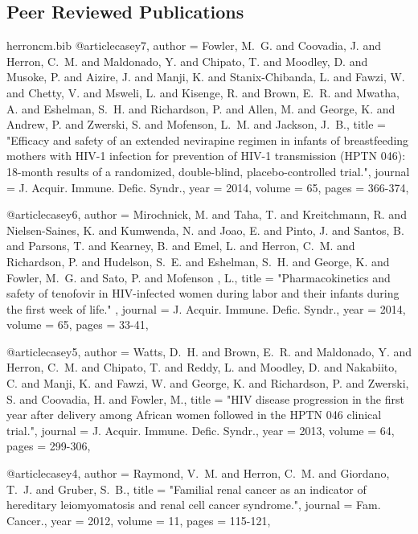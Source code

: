 \documentclass{res}
\begin{document}
\begin{resume}
\section{Peer Reviewed Publications}
\renewcommand{\section}[2]{}%
\begin{filecontents}{herroncm.bib}
@article{casey7,
author = {{Fowler}, M.~G. and {Coovadia}, J. and {Herron}, C.~M. and {Maldonado}, Y. and {Chipato}, T. and {Moodley}, D. and {Musoke}, P. and {Aizire}, J. and {Manji}, K. and {Stanix-Chibanda}, L. and {Fawzi}, W. and {Chetty}, V. and {Msweli}, L. and {Kisenge}, R. and {Brown}, E.~R. and {Mwatha}, A. and {Eshelman}, S.~H. and {Richardson}, P. and {Allen}, M. and {George}, K. and {Andrew}, P. and {Zwerski}, S. and {Mofenson}, L.~M. and {Jackson}, J.~B.},
title = "{Efficacy and safety of an extended nevirapine regimen in infants of breastfeeding mothers with HIV-1 infection for prevention of HIV-1 transmission (HPTN 046): 18-month results of a randomized, double-blind, placebo-controlled trial.}",
journal = {J. Acquir. Immune. Defic. Syndr.},
year = 2014,
volume = 65,
pages = {366-374},
}

@article{casey6,
author = {{Mirochnick}, M. and {Taha}, T. and {Kreitchmann}, R. and {Nielsen-Saines}, K. and {Kumwenda}, N. and {Joao}, E. and {Pinto}, J. and {Santos}, B. and {Parsons}, T. and {Kearney}, B. and {Emel}, L. and {Herron}, C.~M. and {Richardson}, P. and {Hudelson}, S.~E. and {Eshelman}, S.~H. and {George}, K. and {Fowler}, M.~G. and {Sato}, P. and {Mofenson} , L.},
title = "{Pharmacokinetics and safety of tenofovir in HIV-infected women during labor and their infants during the first week of life.}" ,
journal = {J. Acquir. Immune. Defic. Syndr.},
year = 2014,
volume = 65,
pages = {33-41},
}

@article{casey5,
author = {{Watts}, D.~H. and {Brown}, E.~R. and {Maldonado}, Y. and {Herron}, C.~M. and {Chipato}, T. and {Reddy}, L. and {Moodley}, D. and {Nakabiito}, C. and {Manji}, K. and {Fawzi}, W. and {George}, K. and {Richardson}, P. and {Zwerski}, S. and {Coovadia}, H. and {Fowler}, M.}, 
title = "{HIV disease progression in the first year after delivery among African women followed in the HPTN 046 clinical trial.}",
journal = {J. Acquir. Immune. Defic. Syndr.},
year = 2013,
volume = 64,
pages = {299-306},
}

@article{casey4,
author = {{Raymond}, V.~M. and {Herron}, C.~M. and {Giordano}, T.~J. and {Gruber}, S.~B.},
title = "{Familial renal cancer as an indicator of hereditary leiomyomatosis and renal cell cancer syndrome.}",
journal = {Fam. Cancer.},
year = 2012,
volume = 11,
pages = {115-121},
}


\end{filecontents}
\end{resume}
\end{document}
